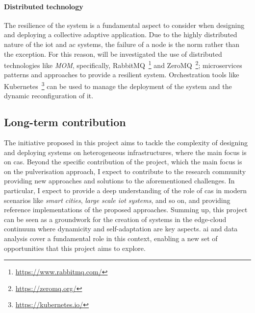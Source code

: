 \documentclass[12pt]{article}
\begin{document}
\paragraph{Distributed technology}
The resilience of the system is a fundamental aspect to consider when designing
and deploying a collective adaptive application.
%
Due to the highly distributed nature of the \ac{iot} and \ac{ac} systems,
the failure of a node is the norm rather than the exception.
%
For this reason, will be investigated the use of distributed technologies like \emph{MOM},
specifically, RabbitMQ~\footnote{\url{https://www.rabbitmq.com/}} and ZeroMQ~\footnote{\url{https://zeromq.org/}};
microservices patterns and approaches to provide a resilient system.
%
Orchestration tools like Kubernetes~\footnote{\url{https://kubernetes.io/}} can be used to manage the deployment of the system
and the dynamic reconfiguration of it.

\subsection{Long-term contribution}
The initiative proposed in this project aims to tackle the complexity of designing and deploying systems on heterogeneous infrastructures,
where the main focus is on \ac{cas}.
%
Beyond the specific contribution of the project,
which the main focus is on the pulverisation approach,
I expect to contribute to the research community providing new approaches and solutions to the aforementioned challenges.
%
In particular,
I expect to provide a deep understanding of the role of \ac{cas} in modern scenarios like \emph{smart cities}, \emph{large scale \ac{iot} systems}, and so on,
and providing reference implementations of the proposed approaches.
%
Summing up,
this project can be seen as a groundwork for the creation of systems in the edge-cloud continuum where dynamicity and self-adaptation are key aspects.
%
\ac{ai} and data analysis cover a fundamental role in this context,
enabling a new set of opportunities that this project aims to explore.

\newpage

\printbibliography
\end{document}
